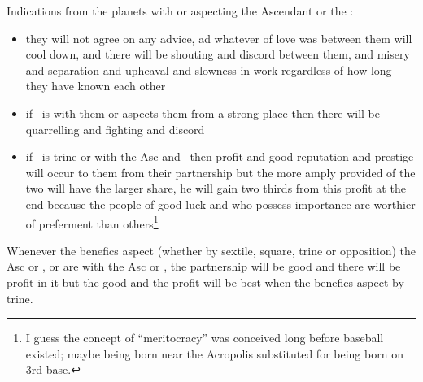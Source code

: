 Indications from the planets with or aspecting the Ascendant or the \Moon:
\begin{itemize}[topsep=0em,itemsep=0em]
\item[\Saturn] they will not agree on any advice, ad whatever of love was between them will cool down, and there will be shouting and discord between them, and misery and separation and upheaval and slowness in work regardless of how long they have known each other
\item[\Mars] if \Mars\, is with them or aspects them from a strong place then there will be quarrelling and fighting and discord
\item[\Jupiter] if \Jupiter\, is trine or with the Asc and \Moon\, then profit and good reputation and prestige will occur to them from their partnership but the more amply provided of the two will have the larger share, he will gain two thirds from this profit at the end because the people of good luck and who possess importance are worthier of preferment than others\footnote{I guess the concept of ``meritocracy'' was conceived long before baseball existed; maybe being born near the Acropolis substituted for being born on 3rd base.}
\end{itemize}

Whenever the benefics aspect (whether by sextile, square, trine or opposition) the Asc or \Moon, or are with the Asc or \Moon, the partnership will be good and there will be profit in it but the good and the profit will be best when the benefics aspect by trine.